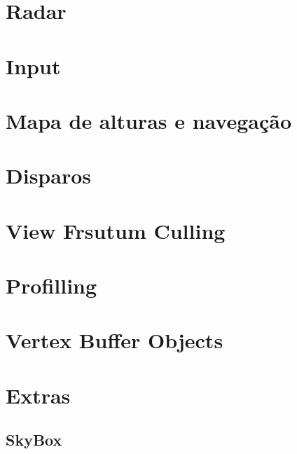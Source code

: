\documentclass[12pt,a4paper,portuges]{style/myreport}
\begin{document}
\newpage

\chapter{Radar}


\newpage

\chapter{Input}


\newpage	

\chapter{Mapa de alturas e navegação}


\chapter{Disparos}

\newpage

\chapter{View Frsutum Culling}


\newpage

\chapter{Profilling}


\newpage

\chapter{Vertex Buffer Objects}

\chapter{Extras}

\section{SkyBox}

\end{document}
